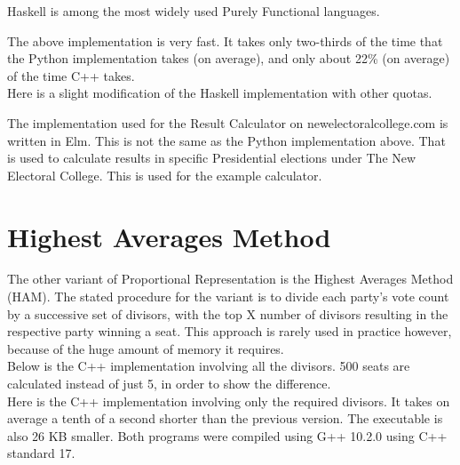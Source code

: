 \documentclass{article}
\begin{document}
    Haskell is among the most widely used Purely Functional languages.

    

    The above implementation is very fast. It takes only two-thirds of the time that the Python implementation takes (on average), and only about 22\% (on average) of the time C++ takes.\\

    Here is a slight modification of the Haskell implementation with other quotas.

    

    The implementation used for the Result Calculator on newelectoralcollege.com is written in Elm. This is not the same as the Python implementation above. That is used to calculate results in specific Presidential elections under The New Electoral College. This is used for the example calculator.

    

    \section{Highest Averages Method}

    The other variant of Proportional Representation is the Highest Averages Method (HAM). The stated procedure for the variant is to divide each party's vote count by a successive set of divisors, with the top X number of divisors resulting in the respective party winning a seat. This approach is rarely used in practice however, because of the huge amount of memory it requires. \\

    Below is the C++ implementation involving all the divisors. 500 seats are calculated instead of just 5, in order to show the difference. \\

    

    Here is the C++ implementation involving only the required divisors. It takes on average a tenth of a second shorter than the previous version. The executable is also 26 KB smaller. Both programs were compiled using G++ 10.2.0 using C++ standard 17. \\
\end{document}

